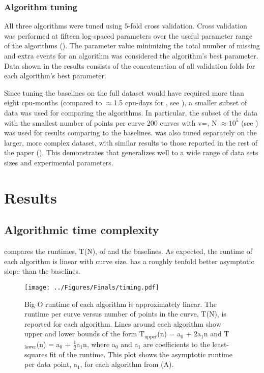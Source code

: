 \subsection{Algorithm tuning}

All three algorithms were tuned using 5-fold cross validation. Cross validation was performed at fifteen log-spaced parameters over the useful parameter range of the algorithms (). The parameter value minimizing the total number of missing and extra events for an algorithm was considered the algorithm's best parameter. Data shown in the results consists of the concatenation of all validation folds for each algorithm's best parameter. 

Since tuning the baselines on the full dataset would have required more than eight cpu-months (compared to $\approx$1.5 cpu-days for \name{}, see ), a smaller subset of data was used for comparing the algorithms. In particular, the subset of the data with the smallest number of points per curve \textemdash{} 200 curves with v=, N $\approx{}10^{5}$ (see ) \textemdash{} was used for results comparing \name{} to the baselines. \name{} was also tuned separately on the larger, more complex dataset, with similar results to those reported in the rest of the paper (). This demonstrates that \name{} generalizes well to a wide range of data sets sizes and experimental parameters.

\chapter{Results}

\section{Algorithmic time complexity}

 compares the runtimes, T(N), of \name{} and the baselines. As expected, the runtime of each algorithm is linear with curve size. \name{} has a roughly tenfold better asymptotic slope than the baselines.  

\begin{figure}[htpb]
\caption[Runtime versus length of curve]{\noindent{} Big-O runtime of each algorithm is approximately linear.  The runtime per curve versus number of points in the curve, T(N), is reported for each algorithm. Lines around each algorithm show upper and lower bounds of the form T$_{\mathrm{upper}}$(n) = a$_0$ + 2a$_1$n  and T$_{\mathrm{lower}}$(n) = a$_0$ + $\frac{1}{2}$a$_1$n, where a$_0$ and a$_1$ are coefficients to the least-squares fit of the runtime.  This plot shows the asymptotic runtime per data point, a$_1$, for each algorithm from (A). }
\centering
\texttt{[image: ../Figures/Finals/timing.pdf]}%
\end{figure}

